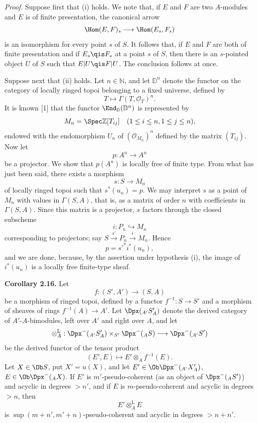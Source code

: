 \emph{Proof.} Suppose first that (i) holds. We note that, if \(E\) and \(F\) are two \(A\)-modules and \(E\) is of finite presentation, the canonical arrow
\[
  \Hom(E,F)_s\longrightarrow \Hom(E_s,F_s)
\]
is an isomorphism for every point \(s\) of \(S\). It follows that, if \(E\) and \(F\) are both of finite presentation and if \(E_s\qis F_s\) at a point \(s\) of \(S\), then there is an \(s\)-pointed object \(U\) of \(S\) such that \(E|U\qis F|U\). The conclusion follows at once.

Suppose next that (ii) holds. Let \(n\in\mathbb N\), and let \(\mathbb D^n\) denote the functor on the category of locally ringed topoi belonging to a fixed universe, defined by
\[
  T\longmapsto \Gamma(T,\mathcal O_T)^n.
\]
It is known [1] that the functor \(\End_{\mathbb D}(\mathbb D^n)\) is represented by
\[
  M_n=\Spec\mathbb Z[T_{ij}]\quad(1\leq i\leq n,
  1\leq j\leq n),
\]
endowed with the endomorphism \(U_n\) of \((\mathcal O_{M_n})^n\) defined by the matrix \((T_{ij})\). Now let
\[
  p:A^n\longrightarrow A^n
\]
be a projector. We show that \(p(A^n)\) is locally free of finite type. From what has just been said, there exists a morphism
\[
  s:S\longrightarrow M_n
\]
of locally ringed topoi such that \(s^*(u_n)=p\). We may interpret \(s\) as a point of \(M_n\) with values in \(\Gamma(S,A)\), that is, as a matrix of order \(n\) with coefficients in \(\Gamma(S,A)\). Since this matrix is a projector, \(s\) factors through the closed subscheme
\[
  i:P_n\hookrightarrow M_n
\]
corresponding to projectors; say \(S\xrightarrow{s'}P_n\xrightarrow{i}M_n\). Hence
\[
  p=s'^* i^*(u_n),
\]
and we are done, because, by the assertion under hypothesis (i), the image of \(i^*(u_n)\) is a locally free finite-type sheaf.

\textbf{Corollary 2.16.} Let
\[
  f:(S',A')\longrightarrow (S,A)
\]
be a morphism of ringed topoi, defined by a functor \(f^{-1}:S\to S'\) and a morphism of sheaves of rings \(f^{-1}(A)\to A'\). Let \(\Dpx(_{A'}S'_A)\) denote the derived category of \(A'\)-\(A\)-bimodules, left over \(A'\) and right over \(A\), and let
\[
  \otimes_A^{\mathrm L}:\Dpx^-(_{A'}S'_A)\times_{S'}\Dpx^-(_A S)
  \longrightarrow \Dpx^-(_{A'}S')
\]
be the derived functor of the tensor product
\[
  (E',E)\longmapsto E'\otimes_A f^{-1}(E).
\]
Let \(X\in\Ob S\), put \(X'=u(X)\), and let \(E'\in\Ob\Dpx^-(_{A'}X'_A)\), \(E\in\Ob\Dpx^-(_A X)\). If \(E'\) is \(m'\)-pseudo-coherent (as an object of \(\Dpx^-(_A S')\)) and acyclic in degrees \(>n'\), and if \(E\) is \(m\)-pseudo-coherent and acyclic in degrees \(>n\), then
\[
  E'\otimes_A^{\mathrm L}E
\]
is \(\sup(m+n',m'+n)\)-pseudo-coherent and acyclic in degrees \(>n+n'\).

